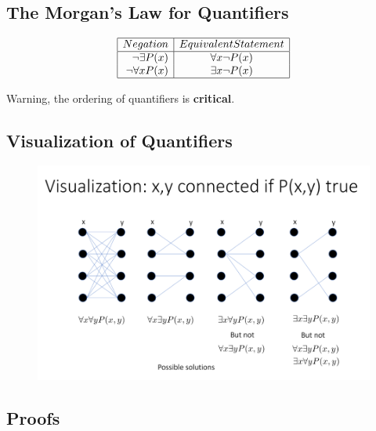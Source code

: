 \documentclass{article}
\begin{document}
\subsection{The Morgan's Law for Quantifiers}
\renewcommand{\arraystretch}{1.5} %
\begin{center} %
\[ %
\begin{array}{|r|c|l|} \hline %
Negation & Equivalent Statement\\ \hline
\neg \exists P(x) & \forall x \neg P(x)\\
\neg \forall x P(x) & \exists x \neg P(x)\\
\hline
\end{array} %
\] %
\end{center}

\begin{tcolorbox}[width=12.1cm, leftrule=3mm]
Warning, the ordering of quantifiers is \textbf{critical}.
\end{tcolorbox}

\subsection{Visualization of Quantifiers}

\begin{figure}[!ht]
  \includegraphics[width=\linewidth]{visualization.png}
  \label{fig:visualization}
\end{figure}

\subsection{Proofs}
\end{document}
